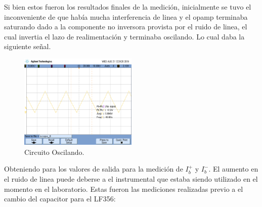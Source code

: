 Si bien estos fueron los resultados finales de la medición, inicialmente se tuvo el inconveniente de que había mucha interferencia de linea y el opamp terminaba saturando dado a la componente no inversora provista por el ruido de linea, el cual invertia el lazo de realimentación y terminaba oscilando.
Lo cual daba la siguiente señal.
\begin{figure}[H]	
	\centering
	\includegraphics[width=0.5\textwidth]{imagenes/opmpOscilando.png}
	\caption{Circuito Oscilando.}
	\label{fig:oscilando}
\end{figure}
Obteniendo para los valores de salida para la medición de $I_b^+$ y $I_b^-$. El aumento en el ruido de linea puede deberse a el instrumental que estaba siendo utilizado en el momento en el laboratorio.
Estas fueron las mediciones realizadas previo a el cambio del capacitor para el LF356:
